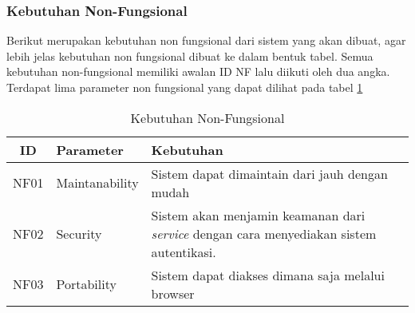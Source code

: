 \subsubsection{Kebutuhan Non-Fungsional}
Berikut merupakan kebutuhan non fungsional dari sistem yang akan dibuat, agar lebih jelas kebutuhan non fungsional dibuat ke dalam bentuk tabel. Semua kebutuhan non-fungsional memiliki awalan ID NF lalu diikuti oleh dua angka. Terdapat lima parameter non fungsional yang dapat dilihat pada tabel \ref{tab:kebutuhan-non-fungsional}

\bgroup
\begin{table}[ht]
  \def\arraystretch{1.7}
  \caption{Kebutuhan Non-Fungsional}
  \label{tab:kebutuhan-non-fungsional}
  \centering
  \begin{tabular}{|c|p{3cm}|p{8cm}|}
    \hline
    ID   & Parameter      & Kebutuhan                                                                                       \\
    \hline
    NF01 & Maintanability & Sistem dapat dimaintain dari jauh dengan mudah                                                  \\
    \hline
    NF02 & Security       & Sistem akan menjamin keamanan dari \textit{service} dengan cara menyediakan sistem autentikasi. \\
    \hline
    NF03 & Portability    & Sistem dapat diakses dimana saja melalui browser                                                \\
    \hline
  \end{tabular}
\end{table}
\egroup